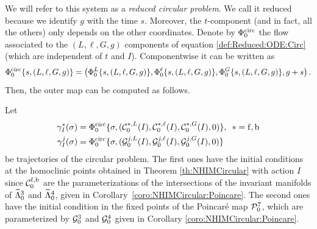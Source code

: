 We will refer to this system as a \emph{reduced circular problem}.  We
call it reduced because we identify $g$ with the time $s$. Moreover,
the $t$-component (and in fact, all the others) only depends on the other coordinates. Denote by $\Phi_0^{\mathrm{circ}}$ the flow associated to the $(L,\ell,G,g)$ components of equation \eqref{def:Reduced:ODE:Circ} (which are independent of $t$ and $I$). Componentwise it can be written as
\begin{equation}\label{def:Flow:Circular}
  \Phi^{\mathrm{circ}}_0\{s,(L,\ell,G,g)\} =
  \left(\Phi^L_0\{s,(L,\ell,G,g)\}, \Phi^\ell_0\{s,(L,\ell,G,g)\},
    \Phi^G_0\{s,(L,\ell,G,g)\}, g+s\right).
\end{equation}
Then, the outer map can be computed as follows.

Let
\begin{equation}\label{def:OrbitsForOuterMap}
\begin{split}
\gamma_I^\ast(\sigma) &=
\Phi^{\mathrm{circ}}_0\{\sigma,(\mathcal{C}_0^{\ast,L}(I),\mathcal{C}_0^{\ast,\ell}(I),\mathcal{C}_0^{\ast,G}(I),0)\},\,\,\,\ast=\mathrm{f},\mathrm{b}\\
\gamma_I^j(\sigma) &=
\Phi^{\mathrm{circ}}_0\{\sigma,(\mathcal{G}_0^{j,L}(I),\mathcal{G}_0^{j,\ell}(I),\mathcal{G}_0^{j,G}(I),0)\}\\
\end{split}
\end{equation}
be trajectories of the circular problem. The first ones have the initial conditions at the homoclinic points obtained in Theorem \ref{th:NHIMCircular}
 with action $I$ since $\mathcal{C}^{\mathrm{f},\mathrm{b}}_0$ are the parameterizations of
the intersections of the invariant manifolds of $\widetilde\Lambda_0^3$ and $\widetilde\Lambda_0^4$, given in
Corollary~\ref{coro:NHIMCircular:Poincare}. The second ones have the initial condition in the fixed points of the Poincar\'e map $\mathcal{P}_0^7$, which are parameterized by $\mathcal{G}_0^3$ and $\mathcal{G}^4_0$ given in Corollary \ref{coro:NHIMCircular:Poincare}.

